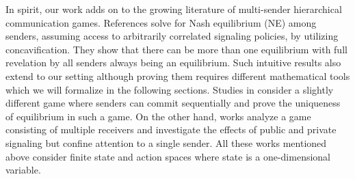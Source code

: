\documentclass[12pt,journal,onecolumn]{IEEEtran}
\begin{document}
In spirit, our work adds on to the growing literature of multi-sender hierarchical communication games. References \cite{gentzkow2017bayesian,gentzkow2016competition} solve for Nash equilibrium (NE) among senders, assuming access to arbitrarily correlated signaling policies, by utilizing concavification. They show that there can be more than one equilibrium with full revelation by all senders always being an equilibrium. Such intuitive results also extend to our setting although proving them requires different mathematical tools which we will formalize in the following sections. Studies in \cite{li2021sequential,wu2021sequential} consider a slightly different game where senders can commit sequentially and prove the uniqueness of equilibrium in such a game. On the other hand, works \cite{wang2013bayesian,arieli2019private,babichenko2016computational} analyze a game consisting of multiple receivers and investigate the effects of public and private signaling but confine attention to a single sender. All these works mentioned above consider finite state and action spaces where state is a one-dimensional variable. 
\end{document}
